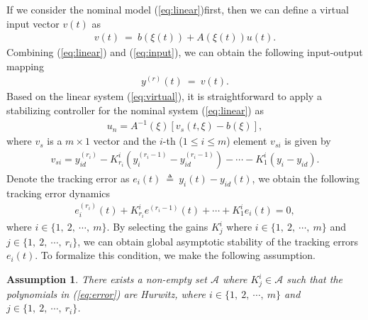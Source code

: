 \documentclass[twoside,leqno,onecolumn]{article}
\newtheorem{assumption}{Assumption}
\begin{document}
If we consider the nominal model (\ref{eq:linear})first, then we can define a virtual input vector $v(t)$ as
\begin{align}
\label{eq:input}
v(t) ~=~ b(\xi(t)) + A (\xi(t)) u(t).
\end{align}
Combining (\ref{eq:linear}) and (\ref{eq:input}), we can obtain the following input-output mapping
\begin{align}
\label{eq:virtual}
y^{(r)}(t) ~=~v(t).
\end{align}
Based on the linear system (\ref{eq:virtual}), it is straightforward to apply a stabilizing controller for the nominal system (\ref{eq:linear}) as
\begin{align}
\label{eq:norm}
u_{n} = A^{-1}(\xi) \left[v_{s}(t,\xi) - b(\xi)\right],
\end{align}
where $v_s$ is a $m\times1$ vector and the $i$-th ($1\leq i \leq m$) element $v_{si}$ is given by
\begin{align}
\label{eq:feedback}
v_{si} = y_{id}^{(r_i)} - K_{r_i}^{i}(y_i^{(r_i-1)}-y_{id}^{(r_i-1)})-\cdots-K_{1}^{i}(y_i-y_{id}).
\end{align}
Denote the tracking error as $e_i(t) ~\triangleq~ y_i(t)- y_{id}(t)$, we obtain  the following tracking error dynamics
\begin{align}
\label{eq:error}
e_i^{(r_i)}(t) +  K^i_{r_i}e^{(r_i-1)}(t) + \cdots + K^i_1e_i(t) = 0,
\end{align}
where $i \in \{1,~2,~\cdots,~m\}$. By selecting the gains $K^i_j$
where $i \in \{1,~2,~\cdots,~m\}$ and $j\in\{1,~2,~\cdots,~r_i\}$,
we can obtain global asymptotic stability of the tracking errors
$e_i(t)$. To formalize this condition, we make the following
assumption.

\begin{assumption}
There exists a non-empty set $\mathcal{A}$ where
$K^i_j\in\mathcal{A} $ such that the polynomials in
(\ref{eq:error}) are Hurwitz, where $i \in \{1,~2,~\cdots,~m\}$
and $j\in\{1,~2,~\cdots,~r_i\}$.
\end{assumption}
\end{document}
